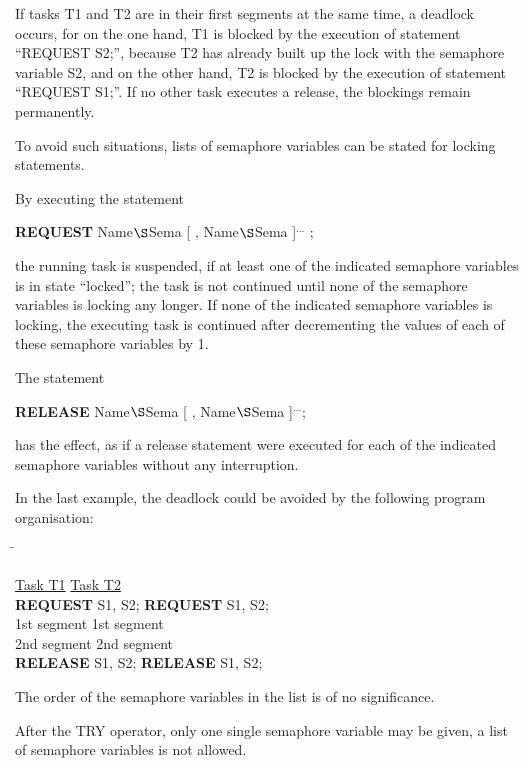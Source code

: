 If tasks T1 and T2 are in their first segments at the same time, a
deadlock occurs, for on the one hand, T1 is blocked by the execution of
statement ``REQUEST S2;'', because T2 has already built up the lock
with the semaphore variable S2, and on the other hand, T2 is blocked by
the execution of statement ``REQUEST S1;''. If no other task executes
a release, the blockings remain permanently.

To avoid such situations, lists of semaphore variables can be stated for
locking statements.

By executing the statement

{\bf REQUEST} Name$\S $Sema [ , Name$\S $Sema ]$^{...}$ ;

the running task is suspended, if at least one of the indicated semaphore
variables is in state ``locked''; the task is not continued until none
of the semaphore variables is locking any longer. If none of the
indicated semaphore variables is locking, the executing task is
continued after decrementing the values of each of these semaphore variables by
1.

The statement

{\bf RELEASE} Name$\S $Sema [ , Name$\S $Sema ]$^{...}$;

has the effect, as if a release statement were executed for each of
the indicated semaphore variables without any interruption.

In the last example, the deadlock could be avoided by the following
program organisation:

\begin{tabbing}
\hspace{6cm} \= \kill

\underline{Task T1}   \>       \underline{Task T2}   \\
{\bf REQUEST} S1, S2; \>       {\bf REQUEST} S1, S2; \\
\x 1st segment        \>       \x 1st segment        \\
\x 2nd segment        \>       \x 2nd segment        \\
{\bf RELEASE} S1, S2; \>       {\bf RELEASE} S1, S2;
\end{tabbing}

The order of the semaphore variables in the list is of no significance.

After the TRY operator, only one single semaphore variable may be
given, a list of semaphore variables is not allowed.

